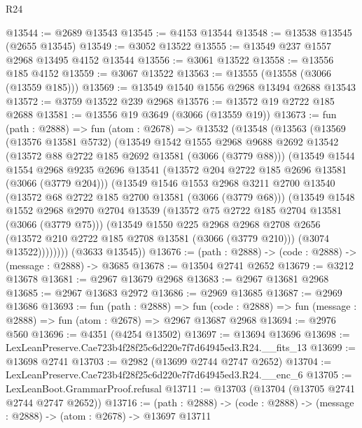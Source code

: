 \begin{lexlean}{R24}
\begin{coremodule}
@13544 := @2689 @13543
@13545 := @4153 @13544
@13548 := @13538 @13545 (@2655 @13545)
@13549 := @3052 @13522
@13555 := @13549 @237 @1557 @2968 @13495 @4152 @13544
@13556 := @3061 @13522
@13558 := @13556 @185 @4152
@13559 := @3067 @13522
@13563 := @13555 (@13558 (@3066 (@13559 @185)))
@13569 := @13549 @1540 @1556 @2968 @13494 @2688 @13543
@13572 := @3759 @13522 @239 @2968
@13576 := @13572 @19 @2722 @185 @2688
@13581 := @13556 @19 @3649 (@3066 (@13559 @19))
@13673 := fun (path : @2888) =>
  fun (atom : @2678) =>
  @13532
    (@13548
      (@13563
        (@13569
          (@13576 @13581 @5732)
          (@13549
            @1542
            @1555
            @2968
            @9688
            @2692
            @13542
            (@13572 @88 @2722 @185 @2692 @13581 (@3066 (@3779 @88)))
            (@13549
              @1544
              @1554
              @2968
              @9235
              @2696
              @13541
              (@13572 @204 @2722 @185 @2696 @13581 (@3066 (@3779 @204)))
              (@13549
                @1546
                @1553
                @2968
                @3211
                @2700
                @13540
                (@13572 @68 @2722 @185 @2700 @13581 (@3066 (@3779 @68)))
                (@13549
                  @1548
                  @1552
                  @2968
                  @2970
                  @2704
                  @13539
                  (@13572 @75 @2722 @185 @2704 @13581 (@3066 (@3779 @75)))
                  (@13549
                    @1550
                    @225
                    @2968
                    @2968
                    @2708
                    @2656
                    (@13572 @210 @2722 @185 @2708 @13581 (@3066 (@3779 @210)))
                    (@3074 @13522))))))))
      (@3633 @13545))
@13676 := (path : @2888) -> (code : @2888) -> (message : @2888) -> @3685
@13678 := @13504 @2741 @2652
@13679 := @3212 @13678
@13681 := @2967 @13679 @2968
@13683 := @2967 @13681 @2968
@13685 := @2967 @13683 @2972
@13686 := @2969 @13685
@13687 := @2969 @13686
@13693 := fun (path : @2888) =>
  fun (code : @2888) => fun (message : @2888) => fun (atom : @2678) => @2967 @13687 @2968
@13694 := @2976 @560
@13696 := @4351 (@4254 @13502)
@13697 := @13694 @13696
@13698 := LexLeanPreserve.Cae723b4f28f25c6d220e7f7d64945ed3.R24.__fits_13
@13699 := @13698 @2741
@13703 := @2982 (@13699 @2744 @2747 @2652)
@13704 := LexLeanPreserve.Cae723b4f28f25c6d220e7f7d64945ed3.R24.__enc_6
@13705 := LexLeanBoot.GrammarProof.refusal
@13711 := @13703 (@13704 (@13705 @2741 @2744 @2747 @2652))
@13716 := (path : @2888) -> (code : @2888) -> (message : @2888) -> (atom : @2678) -> @13697 @13711

\end{coremodule}
\end{lexlean}
